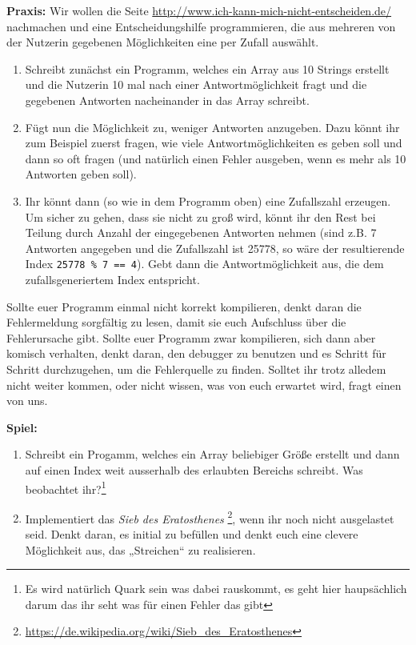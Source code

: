 \textbf{Praxis:}
Wir wollen die Seite \url{http://www.ich-kann-mich-nicht-entscheiden.de/}
nachmachen und eine Entscheidungshilfe programmieren, die aus mehreren von der
Nutzerin gegebenen Möglichkeiten eine per Zufall auswählt.

\begin{enumerate}
    \item Schreibt zunächst ein Programm, welches ein Array aus 10 Strings
        erstellt und die Nutzerin 10 mal nach einer Antwortmöglichkeit fragt
        und die gegebenen Antworten nacheinander in das Array schreibt.
    \item Fügt nun die Möglichkeit zu, weniger Antworten anzugeben. Dazu könnt
        ihr zum Beispiel zuerst fragen, wie viele Antwortmöglichkeiten es geben
        soll und dann so oft fragen (und natürlich einen Fehler ausgeben, wenn
        es mehr als 10 Antworten geben soll).
    \item Ihr könnt dann (so wie in dem Programm oben) eine Zufallszahl
        erzeugen. Um sicher zu gehen, dass sie nicht zu groß wird, könnt ihr
        den Rest bei Teilung durch Anzahl der eingegebenen Antworten nehmen
        (sind z.B. 7 Antworten angegeben und die Zufallszahl ist 25778, so wäre
        der resultierende Index \texttt{25778 \% 7 == 4}). Gebt dann die
        Antwortmöglichkeit aus, die dem zufallsgeneriertem Index
        entspricht.
\end{enumerate}

Sollte euer Programm einmal nicht korrekt kompilieren, denkt daran die
Fehlermeldung sorgfältig zu lesen, damit sie euch Aufschluss über die
Fehlerursache gibt. Sollte euer Programm zwar kompilieren, sich dann aber
komisch verhalten, denkt daran, den debugger zu benutzen und es Schritt für
Schritt durchzugehen, um die Fehlerquelle zu finden. Solltet ihr trotz alledem
nicht weiter kommen, oder nicht wissen, was von euch erwartet wird, fragt einen
von uns.

\textbf{Spiel:}
\begin{enumerate}
    \item Schreibt ein Progamm, welches ein Array beliebiger Größe erstellt und
        dann auf einen Index weit ausserhalb des erlaubten Bereichs schreibt.
        Was beobachtet ihr?\footnote{Es wird natürlich Quark sein was dabei
				rauskommt, es geht hier haupsächlich darum das ihr seht was für
				einen Fehler das gibt}
    \item Implementiert das \emph{Sieb des Eratosthenes}
        \footnote{\url{https://de.wikipedia.org/wiki/Sieb_des_Eratosthenes}},
        wenn ihr noch nicht ausgelastet seid.
        Denkt daran, es initial zu befüllen und denkt euch eine clevere
        Möglichkeit aus, das „Streichen“ zu realisieren.
\end{enumerate}
